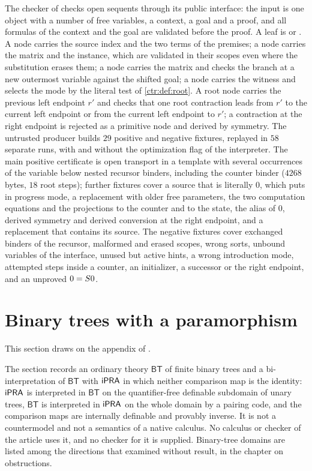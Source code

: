 The checker of  checks open sequents through its public interface:
the input is one object with a number of free variables, a context, a goal and a proof, and all
formulas of the context and the goal are validated before the proof. A leaf is 
or . A  node carries the source index and the two terms of the
premises; a  node carries the matrix and the instance, which are validated in
their scopes even where the substitution erases them; a  node carries the matrix
and checks the branch at a new outermost variable against the shifted goal; a 
node carries the witness and selects the mode by the literal test of \cref{ctr:def:root}. A
root node carries the previous left endpoint $r'$ and checks that one root contraction leads
from $r'$ to the current left endpoint or from the current left endpoint to $r'$; a contraction
at the right endpoint is rejected as a primitive node and derived by symmetry. The untrusted
producer builds $29$ positive and negative fixtures, replayed in $58$ separate runs, with and
without the optimization flag of the interpreter. The main positive certificate is open
transport in a template with several occurrences of the variable below nested recursor
binders, including the counter binder ($4268$ bytes, $18$ root steps); further fixtures cover
a source that is literally $0$, which puts  in progress mode, a replacement with
older free parameters, the two computation equations and the projections to the counter and to
the state, the alias of $0$, derived symmetry and derived conversion at the right endpoint,
and a replacement that contains its source. The negative fixtures cover exchanged binders of
the recursor, malformed and erased scopes, wrong sorts, unbound variables of the interface,
unused but active hints, a wrong introduction mode, attempted steps inside a counter, an
initializer, a successor or the right endpoint, and an unproved $0=S 0$.

\section{Binary trees with a paramorphism}\label{ctr:sec:tree}

This section draws on the appendix of .

The section records an ordinary theory $\mathsf{BT}$ of finite binary trees and a
bi-interpretation of $\mathsf{BT}$ with $\mathsf{iPRA}$ in which neither comparison map is the
identity: $\mathsf{iPRA}$ is interpreted in $\mathsf{BT}$ on the quantifier-free definable subdomain of
unary trees, $\mathsf{BT}$ is interpreted in $\mathsf{iPRA}$ on the whole domain by a pairing code, and
the comparison maps are internally definable and provably inverse. It is not a countermodel
and not a semantics of a native calculus. No calculus or checker of the article uses it, and
no checker for it is supplied. Binary-tree domains are listed among the directions that
 examined without result, in the chapter on obstructions.

